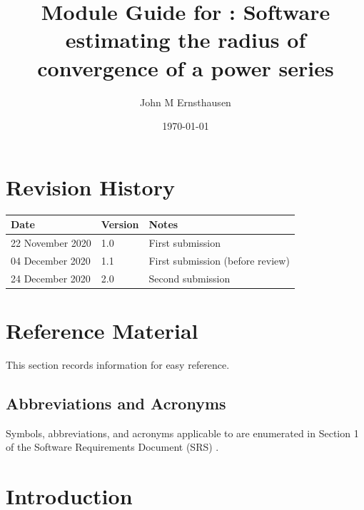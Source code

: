 \documentclass[12pt, titlepage]{article}
\begin{document}
\title{Module Guide for : Software estimating the radius of convergence of
a power series} 
\author{John M Ernsthausen}
\date{\today}

\maketitle


\section{Revision History}

\begin{tabularx}{\textwidth}{p{4cm}p{2cm}X}
\toprule {\bf Date} & {\bf Version} & {\bf Notes}\\
\midrule
  22 November 2020 & 1.0 & First submission\\
  04 December 2020 & 1.1 & First submission (before review)\\
24 December 2020 & 2.0 & Second submission\\
\bottomrule
\end{tabularx}

\newpage

\section{Reference Material}

This section records information for easy reference.

\subsection{Abbreviations and Acronyms}

Symbols, abbreviations, and acronyms applicable to  are enumerated
in Section 1 of the Software Requirements Document (SRS) \citep{SRS}.

\newpage

\tableofcontents

\listoftables

\listoffigures

\newpage


\section{Introduction}
\end{document}
